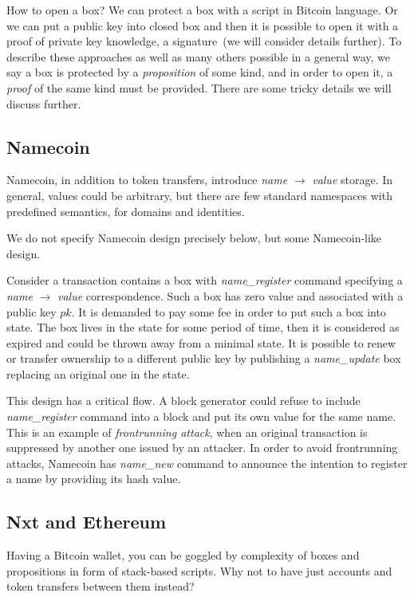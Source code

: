 \documentclass[]{report}   %
\begin{document}
How to open a box? We can protect a box with a script in Bitcoin language. Or we can put a public key into closed box and then it is possible to open it with a proof of private key knowledge, a signature~(we will consider details further). To describe these approaches as well as many others possible in a general way, we say a box is protected by a \textit{proposition} of some kind, and in order to open it, a \textit{proof} of the same kind must be provided. There are some tricky details we will discuss further.

\subsection{Namecoin}

Namecoin, in addition to token transfers, introduce \textit{name} $\rightarrow$ \textit{value} storage. In general, values could be arbitrary, but there are few  standard namespaces with predefined semantics, for domains and identities.

We do not specify Namecoin design precisely below, but some Namecoin-like design. 

Consider a transaction contains a box with \textit{name\_register} command specifying a \textit{name} $\rightarrow$ \textit{value} correspondence. Such a box has zero value and associated with a public key \(pk\). It is demanded to pay some fee in order to put such a box into state. The box lives in the state for some period of time, then it is considered as expired and could be thrown away from a minimal state. It is possible to renew or transfer ownership to a different public key by publishing a \textit{name\_update} box replacing an original one in the state.

This design has a critical flow. A block generator could refuse to include \textit{name\_register} command into a block and put its own value for the same name. This is an example of \textit{frontrunning attack}, when an original transaction is suppressed by another one issued by an attacker. In order to avoid frontrunning attacks, Namecoin has \textit{name\_new} command to announce the intention to register a name by providing its hash value.


\subsection{Nxt and Ethereum}	

Having a Bitcoin wallet, you can be goggled by complexity of boxes and propositions in form of stack-based scripts. Why not to have just accounts and token transfers between them instead? 
\end{document}
